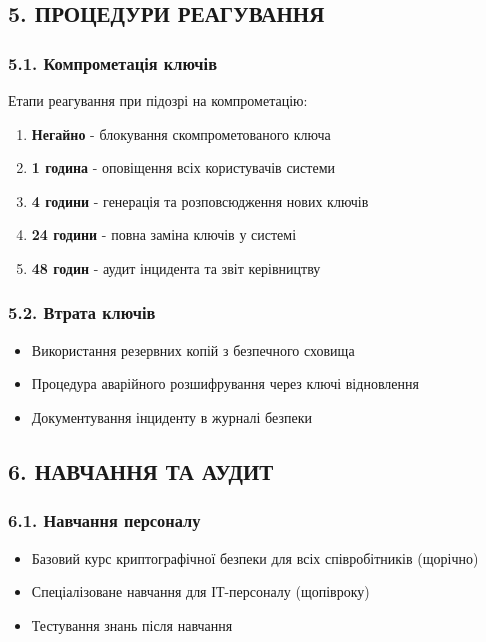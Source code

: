 \subsection*{5. ПРОЦЕДУРИ РЕАГУВАННЯ}

\subsubsection*{5.1. Компрометація ключів}

Етапи реагування при підозрі на компрометацію:
\begin{enumerate}
    \item \textbf{Негайно} - блокування скомпрометованого ключа
    \item \textbf{1 година} - оповіщення всіх користувачів системи
    \item \textbf{4 години} - генерація та розповсюдження нових ключів
    \item \textbf{24 години} - повна заміна ключів у системі
    \item \textbf{48 годин} - аудит інцидента та звіт керівництву
\end{enumerate}

\subsubsection*{5.2. Втрата ключів}
\begin{itemize}
    \item Використання резервних копій з безпечного сховища
    \item Процедура аварійного розшифрування через ключі відновлення
    \item Документування інциденту в журналі безпеки
\end{itemize}

\subsection*{6. НАВЧАННЯ ТА АУДИТ}

\subsubsection*{6.1. Навчання персоналу}
\begin{itemize}
    \item Базовий курс криптографічної безпеки для всіх співробітників (щорічно)
    \item Спеціалізоване навчання для ІТ-персоналу (щопівроку)
    \item Тестування знань після навчання
\end{itemize}

